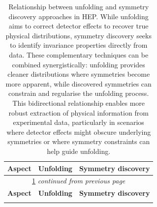 \begin{longtable}{@{}l p{} p{}@{}}
    \caption[Relationship between unfolding and symmetry discovery in particle physics.]{\normalsize Relationship between unfolding and symmetry discovery approaches in HEP. While unfolding aims to correct detector effects to recover true physical distributions, symmetry discovery seeks to identify invariance properties directly from data. These complementary techniques can be combined synergistically: unfolding provides cleaner distributions where symmetries become more apparent, while discovered symmetries can constrain and regularise the unfolding process. This bidirectional relationship enables more robust extraction of physical information from experimental data, particularly in scenarios where detector effects might obscure underlying symmetries or where symmetry constraints can help guide unfolding.}
    \label{tab:unfolding-vs-symmetry} \\
    \toprule
    \textbf{Aspect} & \textbf{Unfolding} & \textbf{Symmetry discovery} \\
    \midrule
    \endfirsthead
    
    \multicolumn{3}{c}{\cref{tab:unfolding-vs-symmetry} \textit{continued from previous page}} \\
    \toprule
    \textbf{Aspect} & \textbf{Unfolding} & \textbf{Symmetry discovery} \\
    \midrule
    \endhead
    
    \bottomrule
    \endlastfoot
    

\end{longtable}
